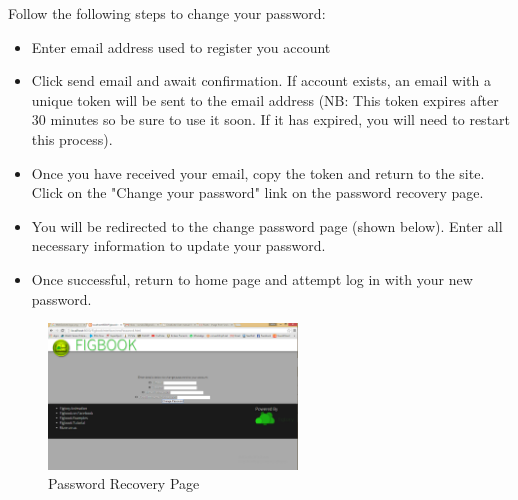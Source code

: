 \par{Follow the following steps to change your password: 

\begin{itemize}
\item Enter email address used to register you account
\item Click send email and await confirmation. If account exists, an email with a unique token will be sent to the email address (NB: This token expires after 30 minutes so be sure to use it soon. If it has expired, you will need to restart this process). 
\item Once you have received your email, copy the token and return to the site. Click on the "Change your password" link on the password recovery page.
\item You will be redirected to the change password page (shown below). Enter all necessary information to update your password.
\item Once successful, return to home page and attempt log in with your new password.

\end{itemize}}

\begin{figure}[h]
	\centering
	\includegraphics[width=250px]{images/passwordReset.png}
	\caption{Password Recovery Page}
\end{figure}
